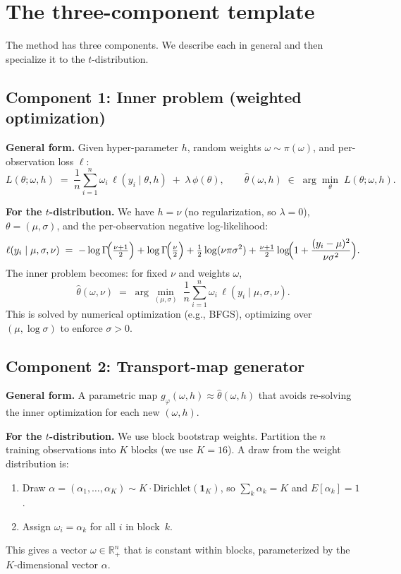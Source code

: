 \documentclass[12pt]{article}
\begin{document}
\section{The three-component template}

The method has three components.  We describe each in general and then specialize it to the $t$-distribution.

\subsection{Component 1: Inner problem (weighted optimization)}

\textbf{General form.}  Given hyper-parameter $h$, random weights $\omega\sim\pi(\omega)$, and per-observation loss $\ell$:
\begin{equation}
\label{eq:inner}
L(\theta;\omega,h) \;=\; \frac{1}{n}\sum_{i=1}^n \omega_i\,\ell(y_i\mid\theta,h) \;+\; \lambda\,\phi(\theta), \qquad \hat\theta(\omega,h) \;\in\; \arg\min_\theta\; L(\theta;\omega,h).
\end{equation}

\textbf{For the $t$-distribution.}  We have $h = \nu$ (no regularization, so $\lambda=0$), $\theta = (\mu,\sigma)$, and the per-observation negative log-likelihood:
\[
\ell(y_i\mid\mu,\sigma,\nu) \;=\; -\log\Gamma\!\Bigl(\tfrac{\nu+1}{2}\Bigr) + \log\Gamma\!\Bigl(\tfrac{\nu}{2}\Bigr) + \tfrac{1}{2}\log(\nu\pi\sigma^2) + \tfrac{\nu+1}{2}\log\!\Bigl(1+\frac{(y_i-\mu)^2}{\nu\sigma^2}\Bigr).
\]
The inner problem becomes: for fixed $\nu$ and weights $\omega$,
\begin{equation}
\label{eq:inner-t}
\hat\theta(\omega,\nu) \;=\; \arg\min_{(\mu,\sigma)}\; \frac{1}{n}\sum_{i=1}^n \omega_i\,\ell(y_i\mid\mu,\sigma,\nu).
\end{equation}
This is solved by numerical optimization (e.g., BFGS), optimizing over $(\mu,\log\sigma)$ to enforce $\sigma>0$.

\subsection{Component 2: Transport-map generator}

\textbf{General form.}  A parametric map $g_\varphi(\omega,h) \approx \hat\theta(\omega,h)$ that avoids re-solving the inner optimization for each new $(\omega,h)$.

\textbf{For the $t$-distribution.}  We use block bootstrap weights.  Partition the $n$ training observations into $K$ blocks (we use $K=16$).  A draw from the weight distribution is:
\begin{enumerate}
\item Draw $\alpha = (\alpha_1,\ldots,\alpha_K) \sim K \cdot \mathrm{Dirichlet}(\mathbf{1}_K)$, so $\sum_k \alpha_k = K$ and $E[\alpha_k]=1$.
\item Assign $\omega_i = \alpha_k$ for all $i$ in block~$k$.
\end{enumerate}
This gives a vector $\omega\in\mathbb{R}^n_+$ that is constant within blocks, parameterized by the $K$-dimensional vector $\alpha$.
\end{document}
